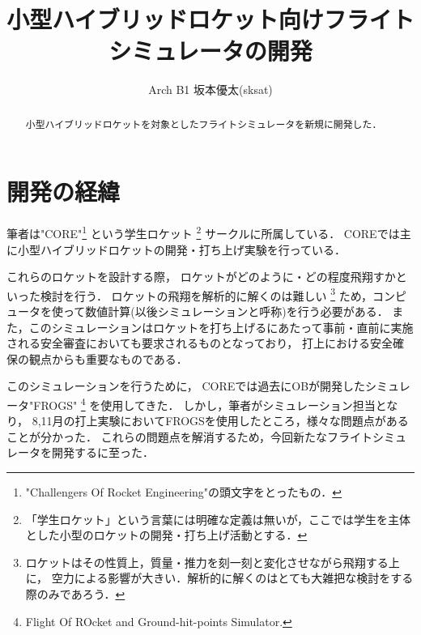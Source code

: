 \documentclass[a4j,10pt]{jsarticle}
\begin{document}

\title{小型ハイブリッドロケット向けフライトシミュレータの開発}

\author{
	Arch B1 坂本優太(sksat)
}

\begin{abstract}
小型ハイブリッドロケットを対象としたフライトシミュレータを新規に開発した．
\end{abstract}

\maketitle
\thispagestyle{empty}

\section{開発の経緯}

筆者は"CORE"\footnote{"Challengers Of Rocket Engineering"の頭文字をとったもの．}
という学生ロケット
\footnote{「学生ロケット」という言葉には明確な定義は無いが，ここでは学生を主体とした小型のロケットの開発・打ち上げ活動とする．}
サークルに所属している．
COREでは主に小型ハイブリッドロケットの開発・打ち上げ実験を行っている．

これらのロケットを設計する際，
ロケットがどのように・どの程度飛翔すかといった検討を行う．
ロケットの飛翔を解析的に解くのは難しい
\footnote{ロケットはその性質上，質量・推力を刻一刻と変化させながら飛翔する上に，
空力による影響が大きい．解析的に解くのはとても大雑把な検討をする際のみであろう．}
ため，コンピュータを使って数値計算(以後シミュレーションと呼称)を行う必要がある．
また，このシミュレーションはロケットを打ち上げるにあたって事前・直前に実施される安全審査においても要求されるものとなっており，
打上における安全確保の観点からも重要なものである．

このシミュレーションを行うために，
COREでは過去にOBが開発したシミュレータ"FROGS"
\footnote{Flight Of ROcket and Ground-hit-points Simulator.}
を使用してきた．
しかし，筆者がシミュレーション担当となり，
8,11月の打上実験においてFROGSを使用したところ，様々な問題点があることが分かった．
これらの問題点を解消するため，今回新たなフライトシミュレータを開発するに至った．

% 
\end{document}
